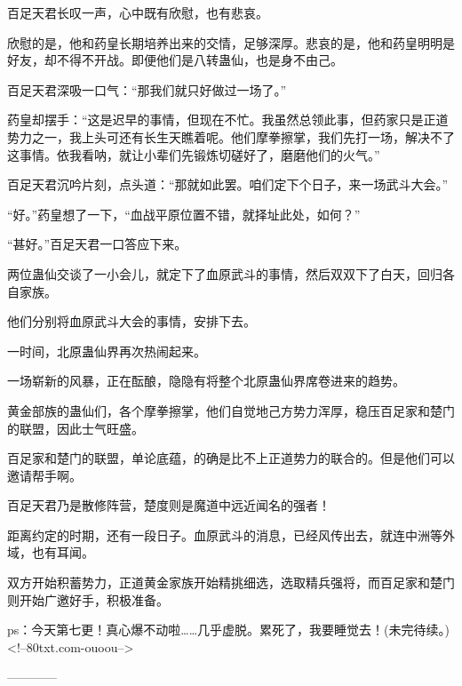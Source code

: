 \begin{this_body}
百足天君长叹一声，心中既有欣慰，也有悲哀。

欣慰的是，他和药皇长期培养出来的交情，足够深厚。悲哀的是，他和药皇明明是好友，却不得不开战。即便他们是八转蛊仙，也是身不由己。

百足天君深吸一口气：“那我们就只好做过一场了。”

药皇却摆手：“这是迟早的事情，但现在不忙。我虽然总领此事，但药家只是正道势力之一，我上头可还有长生天瞧着呢。他们摩拳擦掌，我们先打一场，解决不了这事情。依我看呐，就让小辈们先锻炼切磋好了，磨磨他们的火气。”

百足天君沉吟片刻，点头道：“那就如此罢。咱们定下个日子，来一场武斗大会。”

“好。”药皇想了一下，“血战平原位置不错，就择址此处，如何？”

“甚好。”百足天君一口答应下来。

两位蛊仙交谈了一小会儿，就定下了血原武斗的事情，然后双双下了白天，回归各自家族。

他们分别将血原武斗大会的事情，安排下去。

一时间，北原蛊仙界再次热闹起来。

一场崭新的风暴，正在酝酿，隐隐有将整个北原蛊仙界席卷进来的趋势。

黄金部族的蛊仙们，各个摩拳擦掌，他们自觉地己方势力浑厚，稳压百足家和楚门的联盟，因此士气旺盛。

百足家和楚门的联盟，单论底蕴，的确是比不上正道势力的联合的。但是他们可以邀请帮手啊。

百足天君乃是散修阵营，楚度则是魔道中远近闻名的强者！

距离约定的时期，还有一段日子。血原武斗的消息，已经风传出去，就连中洲等外域，也有耳闻。

双方开始积蓄势力，正道黄金家族开始精挑细选，选取精兵强将，而百足家和楚门则开始广邀好手，积极准备。

ps：今天第七更！真心爆不动啦……几乎虚脱。累死了，我要睡觉去！(未完待续。)<!--80txt.com-ouoou-->

------------

\end{this_body}


